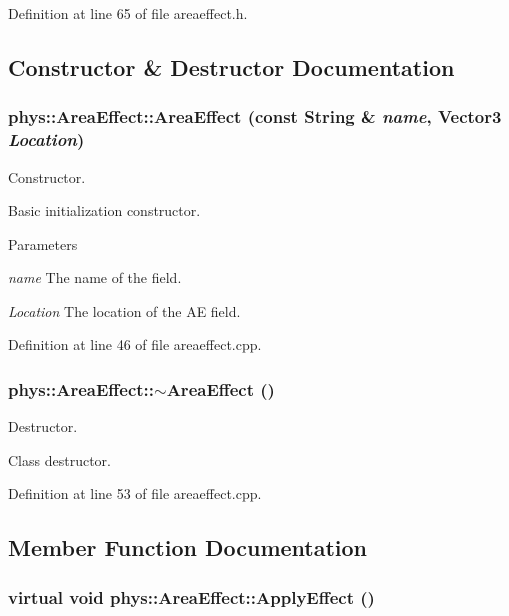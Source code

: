 Definition at line 65 of file areaeffect.h.



\subsection{Constructor \& Destructor Documentation}
\hypertarget{classphys_1_1AreaEffect_a0c6710f348ab875cca41b613798f1f2a}{
\subsubsection[{AreaEffect}]{\setlength{\rightskip}{0pt plus 5cm}phys::AreaEffect::AreaEffect (const {\bf String} \& {\em name}, \/  {\bf Vector3} {\em Location})}}
\label{d4/d55/classphys_1_1AreaEffect_a0c6710f348ab875cca41b613798f1f2a}


Constructor. 

Basic initialization constructor. 
\begin{DoxyParams}{Parameters}
\item[{\em name}]The name of the field. \item[{\em Location}]The location of the AE field. \end{DoxyParams}


Definition at line 46 of file areaeffect.cpp.

\hypertarget{classphys_1_1AreaEffect_aa9e6d721d337c32aa47357060d319924}{
\subsubsection[{$\sim$AreaEffect}]{\setlength{\rightskip}{0pt plus 5cm}phys::AreaEffect::$\sim$AreaEffect ()}}
\label{d4/d55/classphys_1_1AreaEffect_aa9e6d721d337c32aa47357060d319924}


Destructor. 

Class destructor. 

Definition at line 53 of file areaeffect.cpp.



\subsection{Member Function Documentation}
\hypertarget{classphys_1_1AreaEffect_a3b285ecfcf9c9200662d510e48dd222a}{
\subsubsection[{ApplyEffect}]{\setlength{\rightskip}{0pt plus 5cm}virtual void phys::AreaEffect::ApplyEffect ()}}
\label{d4/d55/classphys_1_1AreaEffect_a3b285ecfcf9c9200662d510e48dd222a}


